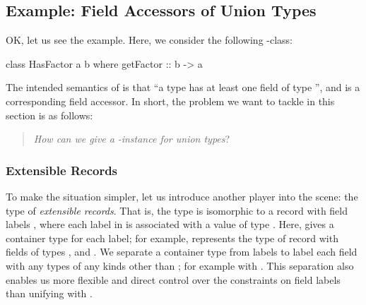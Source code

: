 \documentclass[demotion-paper.tex]{subfiles}
\begin{document}
\subsection{Example: Field Accessors of Union Types}
OK, let us see the example.
Here, we consider the following -class:

\begin{code}
class HasFactor a b where
  getFactor :: b -> a
\end{code}

The intended semantics of  is that ``a type  has at least one field of type '', and  is a corresponding field accessor.
In short, the problem we want to tackle in this section is as follows:
\begin{quote}
  \emph{How can we give a} \emph{-instance for union types}?
\end{quote}

\subsubsection{Extensible Records}
To make the situation simpler, let us introduce another player into the scene: the type  of \emph{extensible records}.
That is, the type  is isomorphic to a record with field labels , where each label  in  is associated with a value of type .
Here,  gives a container type for each label; for example,  represents the type of record with fields of types ,  and .
We separate a container type  from labels  to label each field with any types of any kinds other than ; for example with .
This separation also enables us more flexible and direct control over the constraints on field labels than unifying  with .
\end{document}
